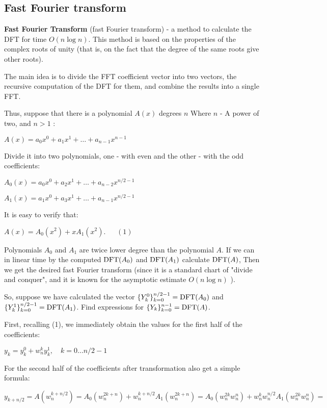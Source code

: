 \subsection{ Fast Fourier transform }

\textbf{Fast Fourier Transform} (fast Fourier transform) - a method to calculate the DFT for time $O (n \log n)$. This method is based on the properties of the complex roots of unity (that is, on the fact that the degree of the same roots give other roots).

The main idea is to divide the FFT coefficient vector into two vectors, the recursive computation of the DFT for them, and combine the results into a single FFT.

Thus, suppose that there is a polynomial $A (x)$ degrees $n$ Where $n$ - A power of two, and $n> 1$ :

$A(x)=a_{0}x^{0}+a_{1}x^{1}+\ldots+a_{n-1}x^{n-1}$

Divide it into two polynomials, one - with even and the other - with the odd coefficients:

$A_{0}(x)=a_{0}x^{0}+a_{2}x^{1}+\ldots+a_{n-2}x^{n/2-1}$

$A_{1}(x)=a_{1}x^{0}+a_{3}x^{1}+\ldots+a_{n-1}x^{n/2-1}$

It is easy to verify that:

$A (x) = A_0 (x ^ 2) + x A_1 (x ^ 2). ~ ~ ~ ~ ~ ~ ~ (1)$

Polynomials $A_0$ and $A_1$ are twice lower degree than the polynomial $A$. If we can in linear time by the computed ${\rm DFT} (A_0)$ and ${\rm DFT} (A_1)$ calculate ${\rm DFT} (A)$, Then we get the desired fast Fourier transform (since it is a standard chart of "divide and conquer", and it is known for the asymptotic estimate $O (n \log n)$ ).

So, suppose we have calculated the vector $\{Y_k ^ 0 \} _ {k = 0} ^ {n/2-1} = {\rm DFT} (A_0)$ and $\{Y_k ^ 1 \} _ {k = 0} ^ {n/2-1} = {\rm DFT} (A_1)$. Find expressions for $\{Y_k \} _ {k = 0} ^ {n-1} = {\rm DFT} (A)$.

First, recalling (1), we immediately obtain the values ​​for the first half of the coefficients:

$y_{k}=y_{k}^{0}+w_{n}^{k}y_{k}^{1},\quad k=0\ldots n/2-1$

For the second half of the coefficients after transformation also get a simple formula:

$y_{k+n/2}=A(w_{n}^{k+n/2})=A_{0}(w_{n}^{2k+n})+w_{n}^{k+n/2}A_{1}(w_{n}^{2k+n})=A_{0}(w_{n}^{2k}w_{n}^{n})+w_{n}^{k}w_{n}^{n/2}A_{1}(w_{n}^{2k}w_{n}^{n})=$

